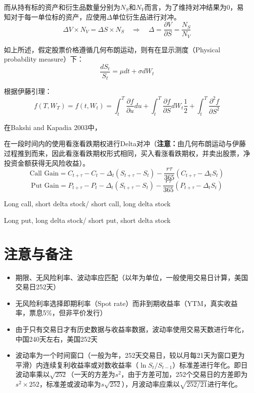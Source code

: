 \documentclass[11pt]{article}
\begin{document}
而从持有标的资产和衍生品数量分别为$N_S$和$N_V$而言，为了维持对冲结果为0，易知对于每一单位标的资产，应使用$\Delta$单位衍生品进行对冲。
\begin{equation*}
    \Delta V \times N_V = \Delta S \times N_S \quad \Rightarrow \quad
    \Delta = \frac{\partial V}{\partial S} = \frac{N_S}{N_V}
\end{equation*}

如上所述，假定股票价格遵循几何布朗运动，则有在显示测度（Physical probability measure）下：
\begin{equation*}
    \frac{dS_t}{S_t} = \mu dt + \sigma dW_t
\end{equation*}

根据伊藤引理：
\begin{equation*}
    f(T,W_T) =f(t,W_t) = \int^T_t \frac{\partial f}{\partial u}du + \int^T_t \frac{\partial f}{\partial S} dW_t \frac{1}{2} + \int^T_t\frac{\partial ^2 f}{\partial S^2} 
\end{equation*}



在Bakshi and Kapadia 2003中，

在一段时间内的使用看涨看跌期权进行Delta对冲（\textbf{注意：}由几何布朗运动与伊藤过程推到而来，因此看涨看跌期权形式相同，买入看涨看跌期权，并卖出股票，净投资金额获得无风险收益）。
\begin{equation*}
    \text{Call Gain} = C_{t+\tau} - C_t - \Delta_t ( S_{t+\tau}-S_t) - \frac{r\tau}{365}(C_{t+\tau} - \Delta_t S_t)
\end{equation*}
\begin{equation*}
    \text{Put Gain} = P_{t+\tau} - P_t - \Delta_t ( S_{t+\tau}-S_t) - \frac{r\tau}{365}(P_{t+\tau} - \Delta_t S_t)
\end{equation*}




Long call, short delta stock/ short call, long delta stock

Long put, long delta stock/ short put, short delta stock

\section{注意与备注}

\begin{itemize}
    \item 期限、无风险利率、波动率应匹配（以年为单位，一般使用交易日计算，美国交易日252天）
    \item 无风险利率选择即期利率（Spot rate）而非到期收益率（YTM，真实收益率，票息5\%，但非平价发行）
    \item 由于只有交易日才有历史数据与收益率数据，波动率使用交易天数进行年化，中国240天左右，美国252天
    \item 波动率为一个时间窗口（一般为年，252天交易日，较以月每21天为窗口更为平滑）内连续复利收益率或对数收益率（$\ln S_t/S_{t-1}$）标准差进行年化。即日波动率乘以$\sqrt{252}$（一天的方差为$s^2$，由于方差可加，252个交易日的方差即为$s^2 \times 252$，标准差或波动率为$s\sqrt{252}$），月波动率应乘以$\sqrt{252/21}$进行年化。
\end{itemize}
\end{document}
